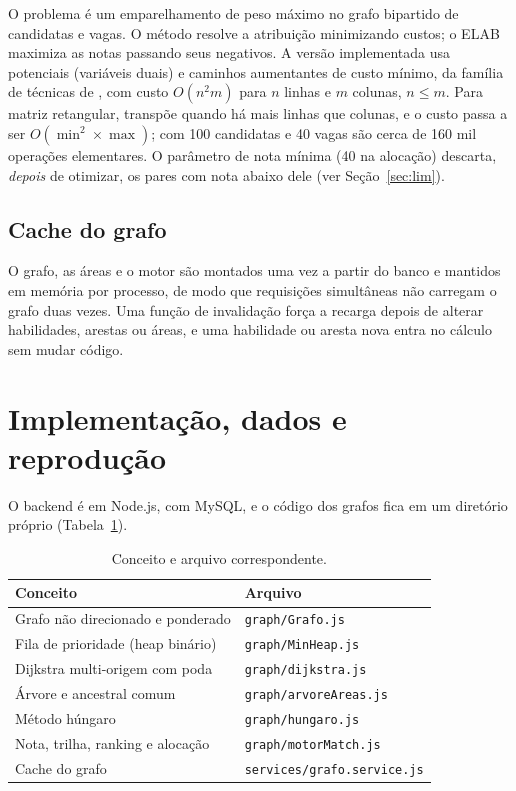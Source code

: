 \documentclass[12pt]{article}
\begin{document}
O problema é um emparelhamento de peso máximo no grafo bipartido de candidatas e vagas. O método resolve a atribuição minimizando custos; o ELAB maximiza as notas passando seus negativos. A versão implementada usa potenciais (variáveis duais) e caminhos aumentantes de custo mínimo, da família de técnicas de \cite{tomizawa1971,edmonds1972}, com custo $O(n^2 m)$ para $n$ linhas e $m$ colunas, $n \le m$. Para matriz retangular, transpõe quando há mais linhas que colunas, e o custo passa a ser $O(\min^2 \times \max)$; com 100 candidatas e 40 vagas são cerca de 160 mil operações elementares. O parâmetro de nota mínima (40 na alocação) descarta, \emph{depois} de otimizar, os pares com nota abaixo dele (ver Seção~\ref{sec:lim}).

\subsection{Cache do grafo}

O grafo, as áreas e o motor são montados uma vez a partir do banco e mantidos em memória por processo, de modo que requisições simultâneas não carregam o grafo duas vezes. Uma função de invalidação força a recarga depois de alterar habilidades, arestas ou áreas, e uma habilidade ou aresta nova entra no cálculo sem mudar código.

\section{Implementação, dados e reprodução}
\label{sec:impl}

O backend é em Node.js, com MySQL, e o código dos grafos fica em um diretório próprio (Tabela~\ref{tab:codigo}).

\begin{table}[ht]
\centering
\caption{Conceito e arquivo correspondente.}
\label{tab:codigo}
\begin{tabular}{p{7.2cm}p{6.8cm}}
\hline
Conceito & Arquivo \\
\hline
Grafo não direcionado e ponderado & \texttt{graph/Grafo.js} \\
Fila de prioridade (heap binário) & \texttt{graph/MinHeap.js} \\
Dijkstra multi-origem com poda & \texttt{graph/dijkstra.js} \\
Árvore e ancestral comum & \texttt{graph/arvoreAreas.js} \\
Método húngaro & \texttt{graph/hungaro.js} \\
Nota, trilha, ranking e alocação & \texttt{graph/motorMatch.js} \\
Cache do grafo & \texttt{services/grafo.service.js} \\
\hline
\end{tabular}
\end{table}
\end{document}
